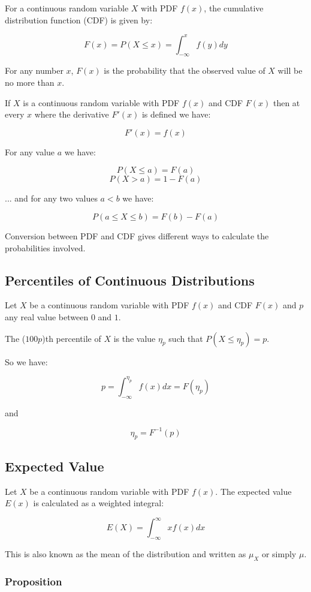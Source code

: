 For a continuous random variable $X$ with PDF $f(x)$, the cumulative distribution function (CDF) is given by:

$$ F(x) = P(X \leq x) = \int_{-\infty}^x f(y) dy $$

For any number $x$, $F(x)$ is the probability that the observed value of $X$ will be no more than $x$.

If $X$ is a continuous random variable with PDF $f(x)$ and CDF $F(x)$ then at every $x$ where the derivative $F'(x)$ is defined we have:

$$ F'(x) = f(x) $$

For any value $a$ we have:

$$ P(X \leq a) = F(a) $$
$$ P(X > a) = 1 - F(a) $$

... and for any two values $a < b$ we have:

$$ P(a \leq X \leq b) = F(b) - F(a) $$

Conversion between PDF and CDF gives different ways to calculate the probabilities involved.

\subsection{Percentiles of Continuous Distributions}

Let $X$ be a continuous random variable with PDF $f(x)$ and CDF $F(x)$ and $p$ any real value between $0$ and $1$.

The ($100p$)th percentile of $X$ is the value $\eta_p$ such that $P(X \leq \eta_p) = p$.

So we have:

$$ p = \int_{-\infty}^{\eta_p} f(x) dx = F(\eta_p) $$

and

$$ \eta_p = F^{-1}(p) $$

\subsection{Expected Value}

Let $X$ be a continuous random variable with PDF $f(x)$. The expected value $E(x)$ is calculated as a weighted integral:

$$ E(X) = \int_{-\infty}^{\infty} xf(x) dx $$

This is also known as the mean of the distribution and written as $\mu_X$ or simply $\mu$.

\subsubsection{Proposition}

